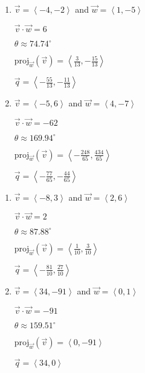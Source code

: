 \documentclass{ximera}
\begin{document}
 
 
\begin{multicols}{2} \raggedcolumns 
\begin{enumerate}
\setcounter{enumi}{\value{HW}}


\item $\vec{v} = \left\langle -4, -2 \right\rangle$ and $\vec{w} = \left\langle 1, -5 \right\rangle$

 $\vec{v} \cdot \vec{w} = 6$

 $\theta \approx  74.74^{\circ}$ 

 $\text{proj}_{\vec{w}}(\vec{v}) = \left\langle \frac{3}{13}, -\frac{15}{13} \right\rangle$

 $\vec{q} = \left\langle -\frac{55}{13}, -\frac{11}{13} \right\rangle$

\vfill

\item $\vec{v} = \left\langle -5, 6 \right\rangle$ and $\vec{w} = \left\langle 4, -7 \right\rangle$

 $\vec{v} \cdot \vec{w} = -62$

 $\theta  \approx  169.94^{\circ}$ 

 $\text{proj}_{\vec{w}}(\vec{v}) = \left\langle -\frac{248}{65}, \frac{434}{65} \right\rangle$

 $\vec{q} = \left\langle -\frac{77}{65}, -\frac{44}{65} \right\rangle$
 
\setcounter{HW}{\value{enumi}}
\end{enumerate}
\end{multicols}
 
 
\pagebreak
 
 
 
\begin{multicols}{2} \raggedcolumns 
\begin{enumerate}
\setcounter{enumi}{\value{HW}}


\item $\vec{v} = \left\langle -8, 3 \right\rangle$ and $\vec{w} = \left\langle 2, 6 \right\rangle$

 $\vec{v} \cdot \vec{w} = 2$

 $\theta \approx 87.88^{\circ}$ 

 $\text{proj}_{\vec{w}}(\vec{v}) = \left\langle \frac{1}{10}, \frac{3}{10} \right\rangle$

 $\vec{q} = \left\langle -\frac{81}{10}, \frac{27}{10} \right\rangle$

\vfill

\item $\vec{v} = \left\langle 34, -91 \right\rangle$ and $\vec{w} = \left\langle 0, 1 \right\rangle$

 $\vec{v} \cdot \vec{w} = -91$

 $\theta \approx  159.51^{\circ}$ 

 $\text{proj}_{\vec{w}}(\vec{v}) = \left\langle 0, -91 \right\rangle$

 $\vec{q} = \left\langle 34, 0 \right\rangle$
 
\setcounter{HW}{\value{enumi}}
\end{enumerate}
\end{multicols}
\end{document}
